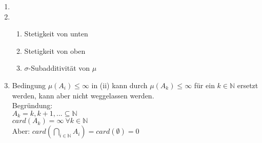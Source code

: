 \documentclass[11pt,a4paper,fleqn,openany]{report}
\begin{document}
    \begin{remark}
      \begin{enumerate}
        \item[]
        \item \begin{enumerate}[label=(\roman*)]
          \item Stetigkeit von unten
          \item Stetigkeit von oben
          \item $\sigma$-Subadditivität von $\mu$
        \end{enumerate}
        \item Bedingung $\mu(A_i) \leq \infty$ in (ii) kann durch $\mu(A_k) \leq \infty$ für ein $k \in \mathbb{N}$ ersetzt werden, kann aber nicht weggelassen werden.\\
              Begründung:\\
              $A_k = {k, k+1,...} \subseteq \mathbb{N}$\\
              $card(A_k) = \infty \ \forall k \in \mathbb{N}$\\
              Aber: $card(\bigcap\limits_{i \in \mathbb{N}} A_i) = card(\emptyset) = 0$ 
      \end{enumerate}
    \end{remark}
\end{document}
